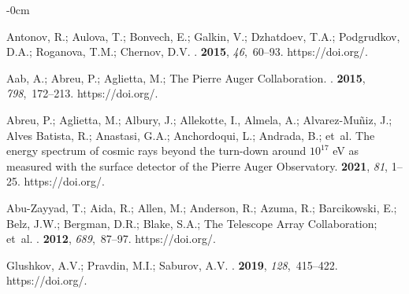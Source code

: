 \documentclass[universe,article,accept,moreauthors,pdftex]{Definitions/mdpi}
\begin{document}
\begin{adjustwidth}{-\extralength}{0cm}
\begin{thebibliography}{999}
Antonov, R.; Aulova, T.; Bonvech, E.; Galkin, V.; Dzhatdoev, T.A.; Podgrudkov, D.A.; Roganova, T.M.; Chernov, D.V.
.
 {\bf 2015}, {\em 46},~60--93.
\newblock
 https://doi.org/{\href{https://doi.org/10.1134/S1063779615010025}{}}.

Aab, A.; Abreu, P.; Aglietta, M.; {The Pierre Auger Collaboration}.
.
 {\bf 2015}, {\em 798},~172--213.
\newblock
  https://doi.org/{\href{https://doi.org/10.1016/j.nima.2015.06.058}{}}.

Abreu, P.; Aglietta, M.; Albury, J.; Allekotte, I., Almela, A.; Alvarez-Muñiz, J.; Alves Batista, R.; Anastasi, G.A.; Anchordoqui, L.; Andrada, B.; et~al.
\newblock The energy spectrum of cosmic rays beyond the turn-down around
  $10^{17}$ eV as measured with the surface detector of the Pierre Auger
  Observatory.
 {\bf 2021}, {\em 81}, 1--25.
\newblock
 https://doi.org/{\href{https://doi.org/10.1140/epjc/s10052-021-09700-w}{}}.

Abu-Zayyad, T.; Aida, R.; Allen, M.; Anderson, R.; Azuma, R.; Barcikowski, E.; Belz, J.W.; Bergman, D.R.; Blake, S.A.; {The Telescope Array
  Collaboration}; et~al.
.
 {\bf 2012}, {\em 689},~87--97.
\newblock
  https://doi.org/{\href{https://doi.org/10.1016/j.nima.2012.05.079}{}}.

Glushkov, A.V.; Pravdin, M.I.; Saburov, A.V.
.
 {\bf 2019}, {\em 128},~415--422.
\newblock
  https://doi.org/{\href{https://doi.org/10.1134/S1063776119020195}{}}.


\end{thebibliography}
\end{adjustwidth}
\end{document}
